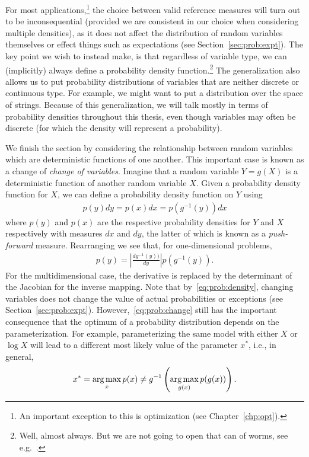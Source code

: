 For most applications,\footnote{An important
	exception to this is optimization (see Chapter~\ref{chp:opt}).}
the choice between valid reference measures will turn out to be
inconsequential (provided we are consistent in our choice when considering multiple
densities), as it does not affect the distribution of random variables themselves 
or effect things such as expectations (see Section~\ref{sec:prob:expt}).  
The key point we wish to instead make, is that regardless of variable type, we can
(implicitly) always define a probability density function.\footnote{Well, almost always.  But we
	are not going to open that can of worms, see e.g.~\cite{durrett2010probability}.}  
The generalization also allows us
to put probability distributions of variables that are neither discrete or continuous type.
For example, we might want to put a distribution over the space of strings.  
Because of this generalization, we will talk mostly in terms of probability densities throughout
this thesis, even though variables may often be discrete (for which the density will 
represent a probability).

We finish the section by considering the relationship between random variables which
are deterministic functions of one another.  This important case is known as a change of
\emph{change of variables}.  Imagine
that a random variable $Y=g(X)$ is a deterministic function of another random variable $X$.
Given a probability density function for $X$, we can define a probability density function
on $Y$ using
\begin{align}
\label{eq:prob:change}
p(y)dy = p(x)dx = p(g^{-1}(y))dx
\end{align} 
where $p(y)$ and $p(x)$ are the respective probability densities for $Y$ and $X$
respectively with measures $dx$ and $dy$,  the latter of which is known as a \emph{push-forward} measure.
Rearranging we see that, for one-dimensional problems, 
\begin{align}
\label{eq:prob:change2}
p(y) = \left|\frac{dg^{-1}(y))}{dy}\right|p(g^{-1}(y)).
\end{align}
For the multidimensional case, the derivative is replaced by the determinant of the
Jacobian for the inverse mapping.  Note that by~\eqref{eq:prob:density}, changing
variables does not change the value of actual probabilities or exceptions (see
 Section~\ref{sec:prob:expt}).  However,~\eqref{eq:prob:change}
still has the important consequence that the optimum of a probability distribution
depends on the parameterization.  For example, parameterizing the same model with
either $X$ or $\log X$ will lead to a different most likely value of the parameter
$x^*$, i.e., in general,
\begin{align}
x^* = \operatorname*{arg\,max}_{x} p(x) \neq g^{-1} \left(\operatorname*{arg\,max}_{g(x)} p(g(x))\right).
\end{align}

